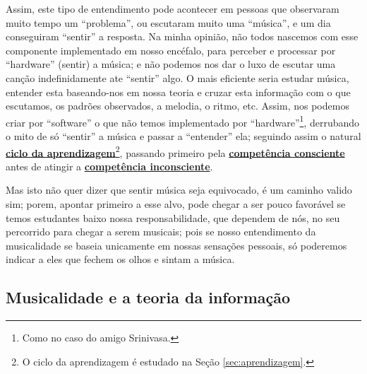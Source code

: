 Assim, este tipo de entendimento  pode acontecer em pessoas que observaram muito tempo um ``problema'', 
ou escutaram muito uma ``música'', 
e um dia conseguiram ``sentir'' a resposta. 
Na minha opinião, 
não todos nascemos com esse componente implementado em nosso encéfalo, para perceber e processar por ``hardware'' (sentir) a música; 
e não podemos nos dar o luxo de escutar uma canção indefinidamente ate ``sentir'' algo. 
O mais eficiente seria estudar música, 
entender esta baseando-nos em nossa teoria e cruzar esta informação com o que escutamos,
os padrões observados, a melodia, o ritmo, etc. 
Assim, nos podemos criar por ``software'' o que não temos implementado por ``hardware''\footnote{Como no caso do amigo Srinivasa.}, 
derrubando o mito de só ``sentir'' a música e passar a ``entender'' ela;
seguindo assim o natural \hyperref[sec:aprendizagem]{\textbf{ciclo da aprendizagem}}\footnote{O
ciclo da aprendizagem é estudado na Seção \ref{sec:aprendizagem}.}, passando primeiro pela 
\hyperref[ref:CompetenciaConsciente]{\textbf{competência consciente}} 
antes de atingir a  \hyperref[ref:CompetenciaInconsciente]{\textbf{competência inconsciente}}.

Mas isto não quer dizer que sentir música seja equivocado, é um caminho valido sim;
porem, apontar primeiro a esse alvo, 
pode chegar a ser pouco favorável se temos estudantes baixo nossa responsabilidade,
 que dependem de nós, no seu percorrido para chegar a serem musicais; 
pois se nosso entendimento da musicalidade se baseia unicamente em nossas sensações pessoais,
só poderemos indicar a eles que fechem os olhos e sintam a música.


\subsection{Musicalidade e a teoria da informação}
\label{sec:musicalidadeinfmutua}


